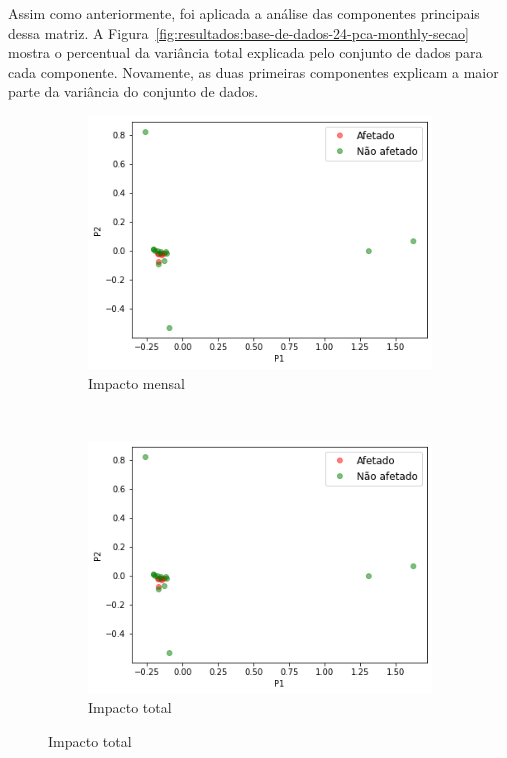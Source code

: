 Assim como anteriormente, foi aplicada a análise das componentes principais dessa matriz. A Figura~\ref{fig:resultados:base-de-dados-24-pca-monthly-secao} mostra o percentual da variância total explicada pelo conjunto de dados para cada componente. Novamente, as duas primeiras componentes explicam a maior parte da variância do conjunto de dados.

\begin{figure}[htb] 
    \centering 
    \caption{Visualização dos dados de seções projetados sobre as duas componentes principais}
    \label{fig:resultados:pca-secao}
    \begin{subfigure}[b]{0.45\textwidth}
        \includegraphics[scale=0.45]{images/base-de-dados-26.2-pca-2d-monthly-secao.png}
        \caption{Impacto mensal}
        \label{fig:resultados:base-de-dados-26.2-pca-2d-monthly-secao}
    \end{subfigure} ~ \quad
    \begin{subfigure}[b]{0.45\textwidth}
        \includegraphics[scale=0.45]{images/base-de-dados-27.2-pca-2d-total-secao.png}
        \caption{Impacto total}
        \label{fig:resultados:base-de-dados-27.2-pca-2d-total-secao}
    \end{subfigure}
    \fdadospesquisa
\end{figure}

